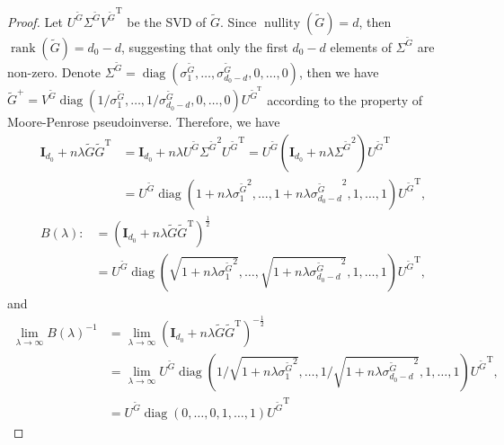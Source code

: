 \documentclass{article}
\newcommand{\T}{\mathrm{T}}
\theoremstyle{plain}
\theoremstyle{definition}
\theoremstyle{remark}
\theoremstyle{remark}
\begin{document}
  \globaloptimareginv*
  \begin{proof}
    Let $U^{\widetilde{G}}\Sigma^{\widetilde{G}} {V^{\widetilde{G}}}^{\T}$ be the SVD of $\widetilde{G}$. Since $\operatorname*{nullity}(\widetilde{G}) = d$, then $\operatorname*{rank}(\widetilde{G}) = d_0-d$, suggesting that only the first $d_0 - d$ elements of $\Sigma^{\widetilde{G}}$ are non-zero. Denote $\Sigma^{\widetilde{G}} = \operatorname*{diag}(\sigma^{\widetilde{G}}_1, \dots, \sigma^{\widetilde{G}}_{d_0-d}, 0, \dots, 0)$, then we have $\widetilde{G}^{+} = V^{\widetilde{G}} \operatorname*{diag}(1/{\sigma^{\widetilde{G}}_1}, \dots, 1/{\sigma^{\widetilde{G}}_{d_0-d}}, 0, \dots, 0) U^{\widetilde{G}^{\T}}$ according to the property of Moore-Penrose pseudoinverse. Therefore, we have 
      \begin{align}
        \mathbf{I}_{d_0}+n\lambda \widetilde{G}\widetilde{G}^{\T} &= \mathbf{I}_{d_0}+n\lambda U^{\widetilde{G}} {\Sigma^{\widetilde{G}}}^2 {U^{\widetilde{G}}}^{\T}= U^{\widetilde{G}} \left(\mathbf{I}_{d_0}+n\lambda {\Sigma^{\widetilde{G}}}^2 \right) {U^{\widetilde{G}}}^{\T} \nonumber \\
        &= U^{\widetilde{G}} \operatorname*{diag}(1+n\lambda {\sigma_1^{\widetilde{G}}}^2, \dots, 1+n\lambda {\sigma_{d_0-d}^{\widetilde{G}}}^2,  1, \dots, 1) {U^{\widetilde{G}}}^{\T},
      \end{align}
      \begin{align}
        B(\lambda) :&= (\mathbf{I}_{d_0}+n\lambda \widetilde{G}\widetilde{G}^{\T})^{\frac{1}{2}} \nonumber \\
        &= U^{\widetilde{G}} \operatorname*{diag}(\sqrt{1+n\lambda {\sigma_1^{\widetilde{G}}}^2}, \dots, \sqrt{1+n\lambda {\sigma_{d_0-d}^{\widetilde{G}}}^2},  1, \dots, 1) {U^{\widetilde{G}}}^{\T},
      \end{align}
      and
      \begin{align}
        \lim_{\lambda \rightarrow \infty}{B(\lambda)}^{-1} &= \lim_{\lambda \rightarrow \infty} (\mathbf{I}_{d_0}+n\lambda \widetilde{G}\widetilde{G}^{\T})^{-\frac{1}{2}} \nonumber \\
        &= \lim_{\lambda \rightarrow \infty} U^{\widetilde{G}} \operatorname*{diag}(1/\sqrt{1+n\lambda {\sigma_1^{\widetilde{G}}}^2}, \dots, 1/\sqrt{1+n\lambda {\sigma_{d_0-d}^{\widetilde{G}}}^2},  1, \dots, 1) {U^{\widetilde{G}}}^{\T}, \nonumber \\
        &= U^{\widetilde{G}} \operatorname*{diag}(0, \dots, 0,  1, \dots, 1) {U^{\widetilde{G}}}^{\T}
      \end{align}
      

\end{proof}
\end{document}
